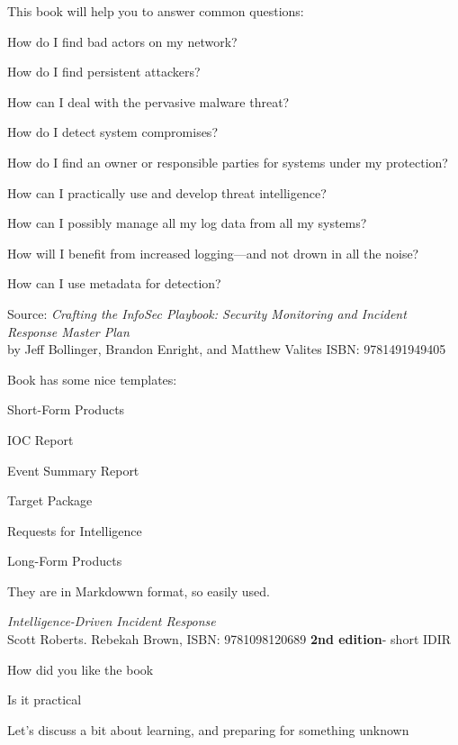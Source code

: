 \documentclass[Screen16to9,17pt]{foils}
\begin{document}


This book will help you to answer common questions:
\begin{list2}
\item How do I find bad actors on my network?
\item How do I find persistent attackers?
\item How can I deal with the pervasive malware threat?
\item How do I detect system compromises?
\item How do I find an owner or responsible parties for systems under my protection?
\item How can I practically use and develop threat intelligence?
\item How can I possibly manage all my log data from all my systems?
\item How will I benefit from increased logging—and not drown in all the noise?
\item How can I use metadata for detection?
\end{list2}
Source: \emph{Crafting the InfoSec Playbook: Security Monitoring and Incident Response Master Plan}\\
 by Jeff Bollinger, Brandon Enright, and Matthew Valites ISBN: 9781491949405



Book has some nice templates:
\begin{list2}
\item Short-Form Products
\item IOC Report
\item Event Summary Report
\item Target Package
\item Requests for Intelligence
\item Long-Form Products
\end{list2}

They are in Markdowwn format, so easily used.



\emph{Intelligence-Driven Incident Response} \\
  Scott Roberts. Rebekah Brown, ISBN: 9781098120689 {\bf 2nd edition}- short IDIR


\begin{list2}
\item How did you like the book
\item Is it practical
\item Let's discuss a bit about learning, and preparing for something unknown
\end{list2}
\end{document}
